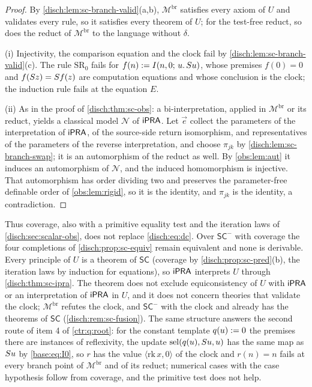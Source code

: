 \begin{proof}
By \cref{disch:lem:sc-branch-valid}(a,b), $\mathcal M^{\mathrm{br}}$ satisfies
every axiom of $U$ and validates every rule, so it satisfies every theorem
of $U$; for the test-free reduct, so does the reduct of
$\mathcal M^{\mathrm{br}}$ to the language without $\delta$.

(i) Injectivity, the comparison equation and the clock fail by
\cref{disch:lem:sc-branch-valid}(c). The rule $\mathrm{SR}_0$ fails for
$f(n)\mathrel{:=}I(n,0;\,u.\,S u)$, whose premises $f(0)=0$ and
$f(S z)=S f(z)$ are computation equations and whose conclusion is the
clock; the induction rule fails at the equation $E$.

(ii) As in the proof of \cref{disch:thm:sc-obs}: a bi-interpretation, applied
in $\mathcal M^{\mathrm{br}}$ or its reduct, yields a classical model
$\mathcal N$ of $\mathsf{iPRA}$. Let $\vec e$ collect the parameters of the
interpretation of $\mathsf{iPRA}$, of the source-side return isomorphism, and
representatives of the parameters of the reverse interpretation, and choose
$\pi_{jk}$ by \cref{disch:lem:sc-branch-swap}; it is an automorphism of the
reduct as well. By \cref{obs:lem:aut} it induces an automorphism of
$\mathcal N$, and the induced homomorphism is injective. That automorphism
has order dividing two and preserves the parameter-free definable order of
\cref{obs:lem:rigid}, so it is the identity, and $\pi_{jk}$ is the identity,
a contradiction.
\end{proof}

Thus coverage, also with a primitive equality test and the iteration laws
of \cref{disch:sec:scalar-obs}, does not replace \eqref{disch:eq:dc}. Over
$\mathsf{SC}^{-}$ with coverage the four completions of
\cref{disch:prop:sc-equiv} remain equivalent and none is derivable. Every
principle of $U$ is a theorem of $\mathsf{SC}$ (coverage by
\cref{disch:prop:sc-pred}(b), the iteration laws by induction for
equations), so $\mathsf{iPRA}$ interprets $U$ through \cref{disch:thm:sc-ipra}. The
theorem does not exclude equiconsistency of $U$ with $\mathsf{iPRA}$ or an
interpretation of $\mathsf{iPRA}$ in $U$, and it does not concern theories that
validate the clock; $\mathcal M^{\mathrm{br}}$ refutes the clock, and
$\mathsf{SC}^{-}$ with the clock and  already has the
theorems of $\mathsf{SC}$ (\cref{disch:rem:sc-fusion}). The same structure
answers the second route of item 4 of \cref{ctr:q:root}: for the constant
template $q(u)\mathrel{:=} 0$ the premises there are instances of reflexivity, the
update $\operatorname{sel}(q(u),S u,u)$ has the same map as $S u$ by
\eqref{base:eq:I0}, so $r$ has the value $\langle\mathrm{rk}\,x,0\rangle$ of
the clock and $r(n)=n$ fails at every branch point of
$\mathcal M^{\mathrm{br}}$ and of its reduct; numerical cases with the case
hypothesis follow from coverage, and the primitive test does not help.

